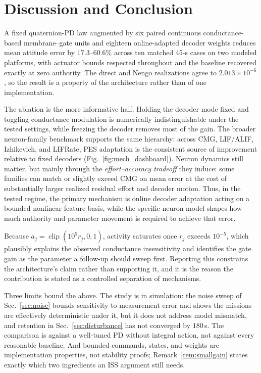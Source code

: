 \documentclass[letterpaper,10pt,conference]{IEEEtran}
\newcommand{\clip}{\operatorname{clip}}
\begin{document}
\section{Discussion and Conclusion}
\label{sec:conclusion}
A fixed quaternion-PD law augmented by six paired continuous conductance-based
membrane--gate units and eighteen online-adapted decoder weights reduces mean
attitude error by $17.3$--$60.6\%$ across ten matched 45-s cases on two modeled
platforms, with actuator bounds respected throughout and the baseline
recovered exactly at zero authority. The direct and Nengo realizations agree
to $2.013\times10^{-6}$, so the result is a property of the architecture
rather than of one implementation.

The ablation is the more informative half. Holding the decoder mode fixed
and toggling conductance modulation is numerically indistinguishable under
the tested settings, while freezing the decoder removes most of the gain.
The broader neuron-family benchmark supports the same hierarchy: across CMG,
LIF/ALIF, Izhikevich, and LIFRate, PES adaptation is the consistent source
of improvement relative to fixed decoders (Fig.~\ref{fig:mech_dashboard}). Neuron dynamics still matter, but mainly
through the \emph{effort--accuracy tradeoff} they induce: some families can
match or slightly exceed CMG on mean error at the cost of substantially
larger realized residual effort and decoder motion. Thus, in the tested
regime, the primary mechanism is online decoder adaptation acting on a
bounded nonlinear feature basis, while the specific neuron model shapes how
much authority and parameter movement is required to achieve that error.

Because $a_j=\clip(10^5r_j,0,1)$, activity saturates once $r_j$ exceeds
$10^{-5}$, which plausibly explains the observed conductance insensitivity
and identifies the gate gain as the parameter a follow-up should sweep
first. Reporting this constrains the architecture's claim rather than
supporting it, and it is the reason the contribution is stated as a
controlled separation of mechanisms.

Three limits bound the above. The study is in simulation: the noise
sweep of Sec.~\ref{sec:noise} bounds sensitivity to measurement error and
shows the missions are effectively deterministic under it, but it does not
address model mismatch, and retention in Sec.~\ref{sec:disturbance} has not
converged by $180$\,s. The comparison is against a well-tuned PD without
integral action, not against every reasonable baseline. And bounded
commands, states, and weights are implementation properties, not stability
proofs; Remark~\ref{rem:smallgain} states exactly which two ingredients an
ISS argument still needs.
\end{document}
